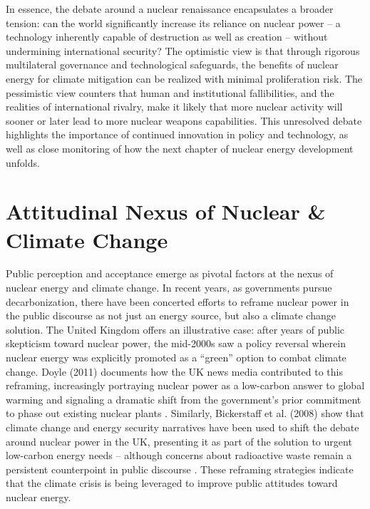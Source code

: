 \documentclass[11,5 pt]{article}
\begin{document}
In essence, the debate around a nuclear renaissance encapsulates a broader tension: can the world significantly increase its reliance on nuclear power – a technology inherently capable of destruction as well as creation – without undermining international security? The optimistic view is that through rigorous multilateral governance and technological safeguards, the benefits of nuclear energy for climate mitigation can be realized with minimal proliferation risk. The pessimistic view counters that human and institutional fallibilities, and the realities of international rivalry, make it likely that more nuclear activity will sooner or later lead to more nuclear weapons capabilities. This unresolved debate highlights the importance of continued innovation in policy and technology, as well as close monitoring of how the next chapter of nuclear energy development unfolds.


\section{Attitudinal Nexus of Nuclear \& Climate Change}


Public perception and acceptance emerge as pivotal factors at the nexus of nuclear energy and climate change. In recent years, as governments pursue decarbonization, there have been concerted efforts to reframe nuclear power in the public discourse as not just an energy source, but also a climate change solution. The United Kingdom offers an illustrative case: after years of public skepticism toward nuclear power, the mid-2000s saw a policy reversal wherein nuclear energy was explicitly promoted as a “green” option to combat climate change. Doyle (2011) documents how the UK news media contributed to this reframing, increasingly portraying nuclear power as a low-carbon answer to global warming and signaling a dramatic shift from the government’s prior commitment to phase out existing nuclear plants \cite{Doyle}. Similarly, Bickerstaff et al. (2008) show that climate change and energy security narratives have been used to shift the debate around nuclear power in the UK, presenting it as part of the solution to urgent low-carbon energy needs – although concerns about radioactive waste remain a persistent counterpoint in public discourse \cite{Bickerstaff}. These reframing strategies indicate that the climate crisis is being leveraged to improve public attitudes toward nuclear energy.
\end{document}
